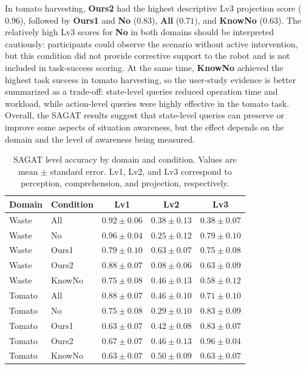 In tomato harvesting, \textbf{Ours2} had the highest descriptive Lv3 projection score ($0.96$), followed by \textbf{Ours1} and \textbf{No} ($0.83$), \textbf{All} ($0.71$), and \textbf{KnowNo} ($0.63$). The relatively high Lv3 scores for \textbf{No} in both domains should be interpreted cautiously: participants could observe the scenario without active intervention, but this condition did not provide corrective support to the robot and is not included in task-success scoring. At the same time, \textbf{KnowNo} achieved the highest task success in tomato harvesting, so the user-study evidence is better summarized as a trade-off: state-level queries reduced operation time and workload, while action-level queries were highly effective in the tomato task. Overall, the SAGAT results suggest that state-level queries can preserve or improve some aspects of situation awareness, but the effect depends on the domain and the level of awareness being measured.

\begin{table}[t]
\centering
\caption{SAGAT level accuracy by domain and condition. Values are mean $\pm$ standard error. Lv1, Lv2, and Lv3 correspond to perception, comprehension, and projection, respectively.}
\label{tab:user_sagat_levels}
\small
\setlength{\tabcolsep}{4pt}
\begin{tabular*}{\textwidth}{@{\extracolsep{\fill}}llccc}
\toprule
\textbf{Domain} & \textbf{Condition} & \textbf{Lv1} & \textbf{Lv2} & \textbf{Lv3} \\
\midrule
Waste & All & $0.92 \pm 0.06$ & $0.38 \pm 0.13$ & $0.38 \pm 0.07$ \\
Waste & No & $0.96 \pm 0.04$ & $0.25 \pm 0.12$ & $0.79 \pm 0.10$ \\
Waste & Ours1 & $0.79 \pm 0.10$ & $0.63 \pm 0.07$ & $0.75 \pm 0.08$ \\
Waste & Ours2 & $0.88 \pm 0.07$ & $0.08 \pm 0.06$ & $0.63 \pm 0.09$ \\
Waste & KnowNo & $0.75 \pm 0.08$ & $0.46 \pm 0.13$ & $0.58 \pm 0.12$ \\
\midrule
Tomato & All & $0.88 \pm 0.07$ & $0.46 \pm 0.10$ & $0.71 \pm 0.10$ \\
Tomato & No & $0.75 \pm 0.08$ & $0.29 \pm 0.10$ & $0.83 \pm 0.09$ \\
Tomato & Ours1 & $0.63 \pm 0.07$ & $0.42 \pm 0.08$ & $0.83 \pm 0.07$ \\
Tomato & Ours2 & $0.67 \pm 0.07$ & $0.46 \pm 0.13$ & $0.96 \pm 0.04$ \\
Tomato & KnowNo & $0.63 \pm 0.07$ & $0.50 \pm 0.09$ & $0.63 \pm 0.07$ \\
\bottomrule
\end{tabular*}
\end{table}

